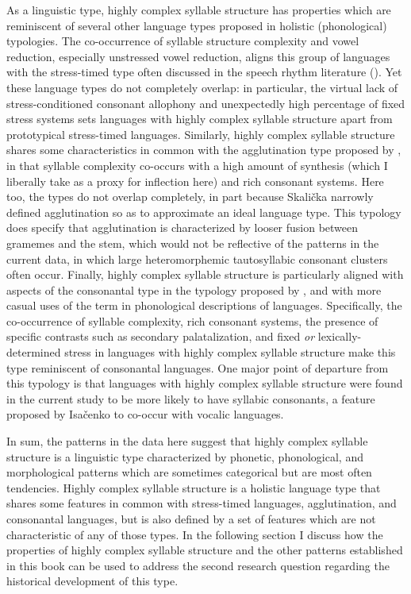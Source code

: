   As a linguistic type, highly complex syllable structure has properties which are reminiscent of several other language types proposed in holistic (phonological) typologies. The co-occurrence of syllable structure complexity and vowel reduction, especially unstressed vowel reduction, aligns this group of languages with the stress-timed type often discussed in the speech rhythm literature (\citealt{Dauer1983,Auer1993,Schiering2007}). Yet these language types do not completely overlap: in particular, the virtual lack of stress-conditioned consonant allophony and unexpectedly high percentage of fixed stress systems sets languages with highly complex syllable structure apart from prototypical stress-timed languages. Similarly, highly complex syllable structure shares some characteristics in common with the agglutination type proposed by \citet{Skalička1979}, in that syllable complexity co-occurs with a high amount of synthesis (which I liberally take as a proxy for inflection here) and rich consonant systems. Here too, the types do not overlap completely, in part because Skalička narrowly defined agglutination so as to approximate an ideal language type. This typology does specify that agglutination is characterized by looser fusion between gramemes and the stem, which would not be reflective of the patterns in the current data, in which large heteromorphemic tautosyllabic consonant clusters often occur. Finally, highly complex syllable structure is particularly aligned with aspects of the consonantal type in the typology proposed by \citet{Isačenko1939/1940}, and with more casual uses of the term in phonological descriptions of languages. Specifically, the co-occurrence of syllable complexity, rich consonant systems, the presence of specific contrasts such as secondary palatalization, and fixed \textit{or} lexically-determined stress in languages with highly complex syllable structure make this type reminiscent of consonantal languages. One major point of departure from this typology is that languages with highly complex syllable structure were found in the current study to be more likely to have syllabic consonants, a feature proposed by Isačenko to co-occur with vocalic languages.

  In sum, the patterns in the data here suggest that highly complex syllable structure is a linguistic type characterized by phonetic, phonological, and morphological patterns which are sometimes categorical but are most often tendencies. Highly complex syllable structure is a holistic language type that shares some features in common with stress-timed languages, agglutination, and consonantal languages, but is also defined by a set of features which are not characteristic of any of those types. In the following section I discuss how the properties of highly complex syllable structure and the other patterns established in this book can be used to address the second research question regarding the historical development of this type.

